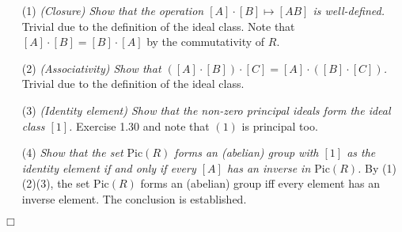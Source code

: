 \documentclass{article}
\begin{document}
\begin{enumerate}
\item[(1)]
\emph{(Closure) Show that the operation $[A] \cdot [B] \mapsto [AB]$ is well-defined. }
Trivial due to the definition of the ideal class.
Note that $[A] \cdot [B] = [B] \cdot [A]$ by the commutativity of $R$.
\item[(2)]
\emph{(Associativity) Show that $([A] \cdot [B]) \cdot [C] = [A] \cdot ([B] \cdot [C])$. }
Trivial due to the definition of the ideal class.
\item[(3)]
\emph{(Identity element) Show that the non-zero principal ideals form the ideal class $[1]$. }
Exercise 1.30 and note that $(1)$ is principal too.
\item[(4)]
\emph{Show that the set $\text{Pic}(R)$ forms an (abelian) group with $[1]$
as the identity element if and only if every $[A]$ has an inverse in $\text{Pic}(R)$.}
By (1)(2)(3), the set $\text{Pic}(R)$ forms an (abelian) group iff
every element has an inverse element. The conclusion is established.
\end{enumerate}
$\Box$ \\\\



\end{document}
